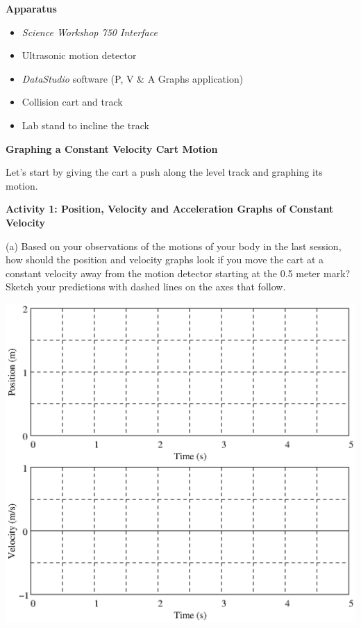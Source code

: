 \textbf{Apparatus} 

\begin{itemize}
\item \textit{Science Workshop 750 Interface}
\item Ultrasonic motion detector 
\item \textit{DataStudio} software (P, V \& A Graphs application)
\item Collision cart and track 
\item Lab stand to incline the track 
\end{itemize}
\textbf{Graphing a Constant Velocity Cart Motion }

Let's start by giving the cart a push along the level track and graphing its
motion. 

\textbf{Activity 1: Position, Velocity and Acceleration Graphs of Constant Velocity} 

(a) Based on your observations of the motions of your body in the last session,
how should the position and velocity graphs look if you move the cart at a constant
velocity away from the motion detector starting at the 0.5 meter mark? Sketch
your predictions with dashed lines on the axes that follow.

\vspace{0.3cm}
{\par\centering \includegraphics{changing_fig1.eps} \par}
\vspace{0.3cm}

